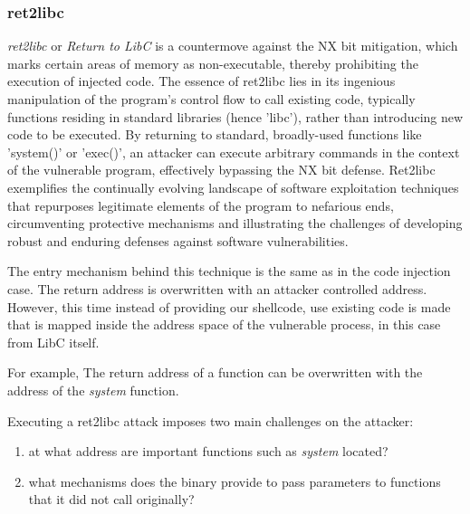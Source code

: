 \documentclass{article}
\begin{document}
\subsubsection{ret2libc}
\emph{ret2libc} or \emph{Return to LibC} is a countermove against the NX bit mitigation, which marks certain areas of memory as non-executable, thereby prohibiting the execution of injected code. The essence of ret2libc lies in its ingenious manipulation of the program's control flow to call existing code, typically functions residing in standard libraries (hence 'libc'), rather than introducing new code to be executed. By returning to standard, broadly-used functions like 'system()' or 'exec()', an attacker can execute arbitrary commands in the context of the vulnerable program, effectively bypassing the NX bit defense. Ret2libc exemplifies the continually evolving landscape of software exploitation techniques that repurposes legitimate elements of the program to nefarious ends, circumventing protective mechanisms and illustrating the challenges of developing robust and enduring defenses against software vulnerabilities.

The entry mechanism behind this technique is the same as in the code injection case. The return address is overwritten with an attacker controlled address. However, this time instead of providing our shellcode, use existing code is made that is mapped inside the address space of the vulnerable process, in this case from LibC itself.


For example, The return address of a function can be overwritten with the address of the \emph{system} function.

Executing a ret2libc attack imposes two main challenges on the attacker:
\begin{enumerate}
  \item at what address are important functions such as \emph{system} located?
  \item what mechanisms does the binary provide to pass parameters to functions that it did not call originally?
\end{enumerate}
\end{document}
